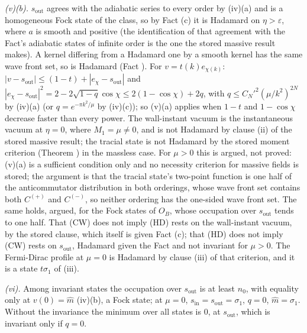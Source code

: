 \emph{(v)(b).} $s_{\mathrm{out}}$ agrees with the adiabatic series to every order by (iv)(a) and is a homogeneous Fock state of the class, so by Fact (c) it is Hadamard on $\eta > \varepsilon$, where $a$ is smooth and positive (the identification of that agreement with the Fact's adiabatic states of infinite order is the one the stored massive result makes). A kernel differing from a Hadamard one by a smooth kernel has the same wave front set, so is Hadamard (Fact ). For $v = t(k)e_{\chi(k)}$: $|v - s_{\mathrm{out}}| \le (1 - t) + |e_{\chi} - s_{\mathrm{out}}|$ and $|e_{\chi} - s_{\mathrm{out}}|^{2} = 2 - 2\sqrt{1 - q}\cos\chi \le 2(1 - \cos\chi) + 2q$, with $q \le C_{N}'^{2}(\mu/k^{2})^{2N}$ by (iv)(a) (or $q = e^{-\pi k^{2}/\mu}$ by (iv)(c)); so (v)(a) applies when $1 - t$ and $1 - \cos\chi$ decrease faster than every power. The wall-instant vacuum is the instantaneous vacuum at $\eta = 0$, where $M_{1} = \mu \ne 0$, and is not Hadamard by clause (ii) of the stored massive result; the tracial state is not Hadamard by the stored moment criterion (Theorem ) in the massless case. For $\mu > 0$ this is argued, not proved: (v)(a) is a sufficient condition only and no necessity criterion for massive fields is stored; the argument is that the tracial state's two-point function is one half of the anticommutator distribution in both orderings, whose wave front set contains both $C^{(+)}$ and $C^{(-)}$, so neither ordering has the one-sided wave front set. The same holds, argued, for the Fock states of $O_{B}$, whose occupation over $s_{\mathrm{out}}$ tends to one half. That (CW) does not imply (HD) rests on the wall-instant vacuum, by the stored clause, which itself is given Fact (c); that (HD) does not imply (CW) rests on $s_{\mathrm{out}}$, Hadamard given the Fact and not invariant for $\mu > 0$. The Fermi-Dirac profile at $\mu = 0$ is Hadamard by clause (iii) of that criterion, and it is a state $t\sigma_{1}$ of (iii).

\emph{(vi).} Among invariant states the occupation over $s_{\mathrm{out}}$ is at least $n_{0}$, with equality only at $v(0) = \hat m$ (iv)(b), a Fock state; at $\mu = 0$, $s_{\mathrm{in}} = s_{\mathrm{out}} = \sigma_{1}$, $q = 0$, $\hat m = \sigma_{1}$. Without the invariance the minimum over all states is $0$, at $s_{\mathrm{out}}$, which is invariant only if $q = 0$.

